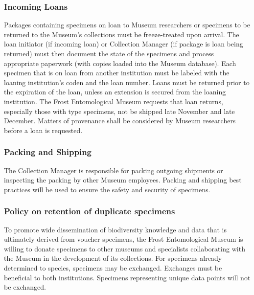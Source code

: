 \documentclass[letterpaper, 11pt]{article}
\begin{document}
\subsubsection{Incoming Loans}
Packages containing specimens on loan to Museum researchers or specimens to be returned to the Museum's collections must be freeze-treated upon arrival. The loan initiator (if incoming loan) or Collection Manager (if package is loan being returned) must then document the state of the specimens and process appropriate paperwork (with copies loaded into the Museum database). Each specimen that is on loan from another institution must be labeled with the loaning institution's coden and the loan number. Loans must be returned prior to the expiration of the loan, unless an extension is secured from the loaning institution. The Frost Entomological Museum requests that loan returns, especially those with type specimens, not be shipped late November and late December. Matters of provenance shall be considered by Museum researchers before a loan is requested.

\subsubsection{Packing and Shipping}
The Collection Manager is responsible for packing outgoing shipments or inspecting the packing by other Museum employees. Packing and shipping best practices will be used to ensure the safety and security of specimens.

\subsubsection{Policy on retention of duplicate specimens}
To promote wide dissemination of biodiversity knowledge and data that is ultimately derived from voucher specimens, the Frost Entomological Museum is willing to donate specimens to other museums and specialists collaborating with the Museum in the development of its collections. For specimens already determined to species, specimens may be exchanged. Exchanges must be beneficial to both institutions. Specimens representing unique data points will not be exchanged. \\
\end{document}
